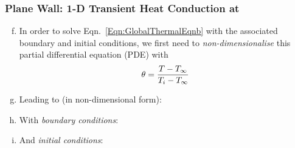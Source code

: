 \documentclass[10pt,compress,unknownkeysallowed]{beamer}
\begin{document}
\begin{frame}
 \frametitle{Plane Wall: 1-D Transient Heat Conduction at  }
   \begin{enumerate}[(a)]\setcounter{enumi}{5}%
     \item<1-> In order to solve Eqn.~\ref{Eqn:GlobalThermalEqnb} with the associated boundary and initial conditions, we first need to {\it non-dimensionalise} this partial differential equation (PDE) with
        \begin{displaymath}
             \theta = \displaystyle\frac{T - T_{\infty}}{T_{i} - T_{\infty}}
        \end{displaymath}    
     \item<2-> Leading to (in non-dimensional form):
     \item<3-> With {\it boundary conditions}:
      \item<3-> And {\it initial conditions}:
   \end{enumerate} 
\end{frame}
\end{document}
